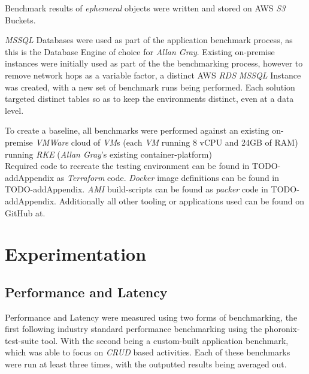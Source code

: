 Benchmark results of \emph{ephemeral} objects were written and stored on AWS \emph{S3} Buckets.

\emph{MSSQL} Databases were used as part of the application benchmark process, as this is the Database Engine of choice for \emph{Allan Gray}.
Existing on-premise instances were initially used as part of the the benchmarking process, however to remove network hops as a variable factor,
a distinct AWS \emph{RDS} \emph{MSSQL} Instance was created, with a new set of benchmark runs being performed.
Each solution targeted distinct tables so as to keep the environments distinct, even at a data level.

To create a baseline, all benchmarks were performed against an existing on-premise \emph{VMWare} cloud of \emph{VM}s (each \textit{VM} running 8 vCPU and 24GB of RAM) running \emph{RKE} (\emph{Allan Gray}'s existing container-platform) \\

\noindent Required code to recreate the testing environment can be found in TODO-addAppendix as \emph{Terraform} code.
\emph{Docker} image definitions can be found in TODO-addAppendix.
\emph{AMI} build-scripts can be found as \emph{packer} code in TODO-addAppendix.
Additionally all other tooling or applications used can be found on GitHub at\cite{bodhanya_2022}.

\chapter{Experimentation}
\section{Performance and Latency}
Performance and Latency were measured using two forms of benchmarking, the first following industry standard performance benchmarking using the phoronix-test-suite\cite{phoronix_test_suite} tool.
With the second being a custom-built application benchmark, which was able to focus on \emph{CRUD} based activities.
Each of these benchmarks were run at least three times, with the outputted results being averaged out.

